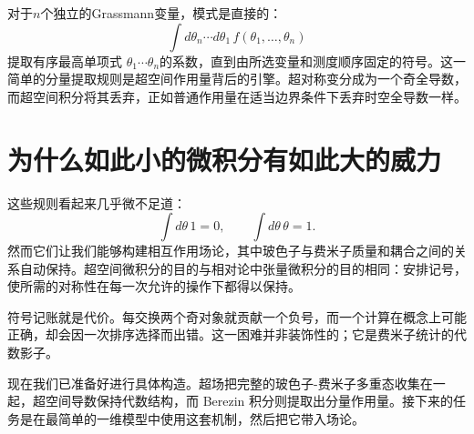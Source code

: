\begin{classroomqa}
\end{classroomqa}

\begin{classroomqa}
\end{classroomqa}

对于\(n\)个独立的Grassmann变量，模式是直接的：
\begin{equation}
\int d\theta_n\cdots d\theta_1\,
f(\theta_1,\ldots,\theta_n)
\end{equation}
提取有序最高单项式
\(\theta_1\cdots\theta_n\)的系数，直到由所选变量和测度顺序固定的符号。这一简单的分量提取规则是超空间作用量背后的引擎。超对称变分成为一个奇全导数，而超空间积分将其丢弃，正如普通作用量在适当边界条件下丢弃时空全导数一样。

\section{为什么如此小的微积分有如此大的威力}

这些规则看起来几乎微不足道：
\begin{equation}
\int d\theta\,1=0,
\qquad
\int d\theta\,\theta=1.
\end{equation}
然而它们让我们能够构建相互作用场论，其中玻色子与费米子质量和耦合之间的关系自动保持。超空间微积分的目的与相对论中张量微积分的目的相同：安排记号，使所需的对称性在每一次允许的操作下都得以保持。

符号记账就是代价。每交换两个奇对象就贡献一个负号，而一个计算在概念上可能正确，却会因一次排序选择而出错。这一困难并非装饰性的；它是费米子统计的代数影子。

\begin{classroomqa}
\end{classroomqa}

现在我们已准备好进行具体构造。超场把完整的玻色子-费米子多重态收集在一起，超空间导数保持代数结构，而 Berezin 积分则提取出分量作用量。接下来的任务是在最简单的一维模型中使用这套机制，然后把它带入场论。
